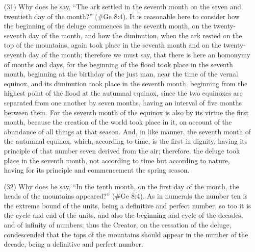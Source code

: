 (31) Why does he say, ``The ark settled in the seventh month on the seven and twentieth day of the
month?'' (\#Ge 8:4). It is reasonable here to consider how the beginning of the deluge
commences in the seventh month, on the twenty-seventh day of the month, and how the diminution,
when the ark rested on the top of the mountains, again took place in the seventh month and on the
twenty-seventh day of the month; therefore we must say, that there is here an homonymy of
months and days, for the beginning of the flood took place in the seventh month, beginning at the
birthday of the just man, near the time of the vernal equinox, and its diminution took place in the
seventh month, beginning from the highest point of the flood at the autumnal equinox, since the two
equinoxes are separated from one another by seven months, having an interval of five months
between them. For the seventh month of the equinox is also by its virtue the first month, because
the creation of the world took place in it, on account of the abundance of all things at that season.
And, in like manner, the seventh month of the autumnal equinox, which, according to time, is the
first in dignity, having its principle of that number seven derived from the air; therefore, the deluge
took place in the seventh month, not according to time but according to nature, having for its
principle and commencement the spring season.

(32) Why does he say, ``In the tenth month, on the first day of the month, the heads of the
mountains appeared?'' (\#Ge 8:4). As in numerals the number ten is the extreme bound of the
units, being a definitive and perfect number, so too it is the cycle and end of the units, and also the
beginning and cycle of the decades, and of infinity of numbers; thus the Creator, on the cessation
of the deluge, condescended that the tops of the mountains should appear in the number of the
decade, being a definitive and perfect number.

